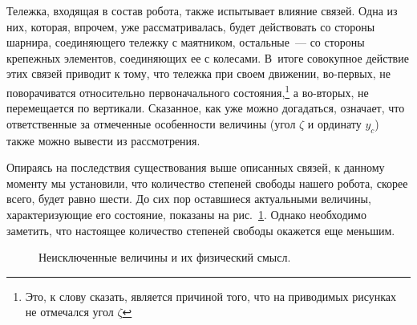 \documentclass[12pt,a4paper,openany]{extarticle}
\begin{document}
Тележка, входящая в состав робота, также испытывает влияние связей.
Одна из них, которая, впрочем, уже рассматривалась, будет действовать со стороны шарнира, соединяющего тележку с маятником, остальные~--- со стороны крепежных элементов, соединяющих ее с колесами.
В~итоге совокупное действие этих связей приводит к тому, что тележка при своем движении, во-первых, не поворачиватся относительно первоначального состояния\lefteqn,\footnote{Это, к слову сказать, является причиной того, что на приводимых рисунках не отмечался угол $\zeta$} а во-вторых, не перемещается по вертикали.
Сказанное, как уже можно догадаться, означает, что ответственные за отмеченные особенности величины (угол $\zeta$ и ординату $y_c$) также можно вывести из рассмотрения. 

Опираясь на последствия существования выше описанных связей, к данному моменту мы установили, что количество степеней свободы нашего робота, скорее всего, будет равно шести.
До сих пор оставшиеся актуальными величины, характеризующие его состояние, показаны на рис.~\ref{cart_in_decart}.
Однако необходимо заметить, что настоящее количество степеней свободы окажется еще меньшим.

\begin{figure}[h]
	\noindent{}
	\caption{Неисключенные величины и их физический смысл.}
	\label{cart_in_decart}
\end{figure}
\end{document}
